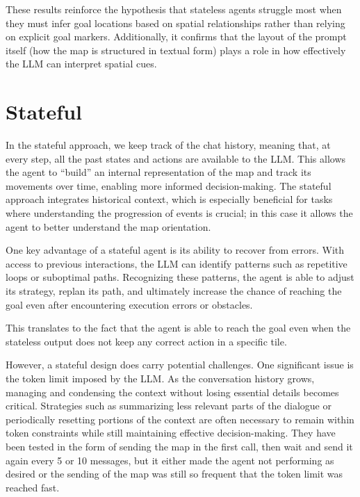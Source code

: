 These results reinforce the hypothesis that stateless agents struggle most when
they must infer goal locations based on spatial relationships rather than
relying on explicit goal markers. Additionally, it confirms that the layout of
the prompt itself (how the map is structured in textual form) plays a role in
how effectively the LLM can interpret spatial cues.

\section{Stateful}
\label{sec:stateful}

In the stateful approach, we keep track of the chat history, meaning that, at
every step, all the past states and actions are available to the LLM. This
allows the agent to ``build'' an internal representation of the map and track
its movements over time, enabling more informed decision-making. The stateful
approach integrates historical context, which is especially beneficial for tasks
where understanding the progression of events is crucial; in this case it allows
the agent to better understand the map orientation.

One key advantage of a stateful agent is its ability to recover from errors. With
access to previous interactions, the LLM can identify patterns such as
repetitive loops or suboptimal paths. Recognizing these patterns, the agent is
able to adjust its strategy, replan its path, and ultimately increase the chance
of reaching the goal even after encountering execution errors or obstacles.

This translates to the fact that the agent is able to reach the goal even when
the stateless output does not keep any correct action in a specific tile.

However, a stateful design does carry potential challenges. One significant
issue is the token limit imposed by the LLM. As the conversation history grows,
managing and condensing the context without losing essential details becomes
critical. Strategies such as summarizing less relevant parts of the dialogue or periodically
resetting portions of the context are often necessary to remain within token constraints
while still maintaining effective decision-making. They have been tested in the
form of sending the map in the first call, then wait and send it again every 5 or
10 messages, but it either made the agent not performing as desired or the
sending of the map was still so frequent that the token limit was reached fast.

